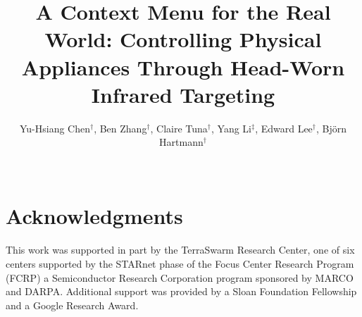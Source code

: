 \documentclass{sigchi}
\begin{document}
\title{A Context Menu for the Real World: Controlling Physical Appliances Through Head-Worn Infrared Targeting}

\author{
\alignauthor Yu-Hsiang Chen$^{\dagger}$, Ben Zhang$^{\dagger}$, Claire Tuna$^{\dagger}$, Yang Li$^{\ddagger}$, Edward Lee$^{\dagger}$, Bj\"orn Hartmann$^{\dagger}$ \\
\\
}


\maketitle

\begin{abstract}

\end{abstract}












\section{Acknowledgments}
This work was supported in part by the TerraSwarm Research Center, one of six centers supported by the STARnet phase of the Focus Center Research Program (FCRP) a Semiconductor Research Corporation program sponsored by MARCO and DARPA. Additional support was provided by a Sloan Foundation Fellowship and a Google Research Award.
\end{document}
